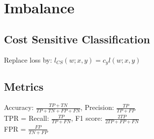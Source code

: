 \section*{Imbalance}
\subsection*{Cost Sensitive Classification}
Replace loss by: $l_{CS}(w;x,y) = c_y l(w;x,y)$

\subsection*{Metrics}
Accuracy: $\frac{TP+TN}{TP+TN+FP+FN}$, Precision: $\frac{TP}{TP+FP}$\\ 
TPR = Recall: $\frac{TP}{TP+FN}$, F1 score: $\frac{2TP}{2TP+FP+FN}$\\
FPR = $\frac{FP}{TN+FP}$